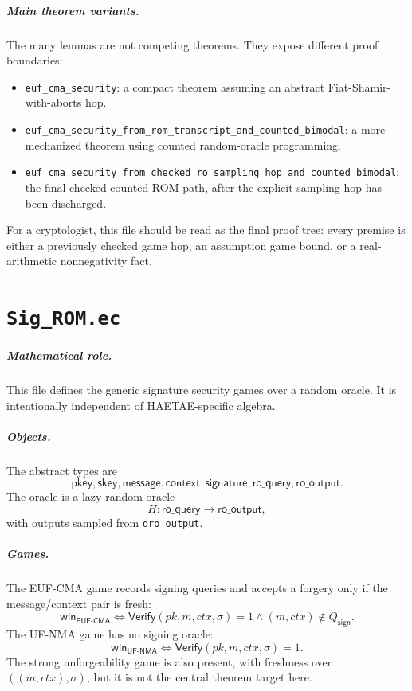 \documentclass[11pt]{report}
\newcommand{\ec}[1]{\nolinkurl{#1}}
\newcommand{\ecchapter}[2]{\chapter{\texorpdfstring{\texttt{#1}}{#2}}}
\newcommand{\EUFCMA}{\mathsf{EUF\mbox{-}CMA}}
\newcommand{\UFNMA}{\mathsf{UF\mbox{-}NMA}}
\theoremstyle{definition}
\theoremstyle{plain}
\theoremstyle{definition}
\begin{document}
\paragraph{Main theorem variants.}
The many lemmas are not competing theorems.  They expose different proof
boundaries:
\begin{itemize}[leftmargin=*]
  \item \ec{euf_cma_security}: a compact theorem assuming an abstract
  Fiat-Shamir-with-aborts hop.
  \item \ec{euf_cma_security_from_rom_transcript_and_counted_bimodal}: a more
  mechanized theorem using counted random-oracle programming.
  \item \ec{euf_cma_security_from_checked_ro_sampling_hop_and_counted_bimodal}:
  the final checked counted-ROM path, after the explicit sampling hop has been
  discharged.
\end{itemize}
For a cryptologist, this file should be read as the final proof tree: every
premise is either a previously checked game hop, an assumption game bound, or a
real-arithmetic nonnegativity fact.



\ecchapter{Sig\_ROM.ec}{Sig ROM.ec}

\paragraph{Mathematical role.}
This file defines the generic signature security games over a random oracle. It
is intentionally independent of HAETAE-specific algebra.

\paragraph{Objects.}
The abstract types are
\[
  \mathsf{pkey}, \mathsf{skey}, \mathsf{message}, \mathsf{context},
  \mathsf{signature}, \mathsf{ro\_query}, \mathsf{ro\_output}.
\]
The oracle is a lazy random oracle
\[
  H : \mathsf{ro\_query}\to\mathsf{ro\_output},
\]
with outputs sampled from \ec{dro_output}.

\paragraph{Games.}
The EUF-CMA game records signing queries and accepts a forgery only if the
message/context pair is fresh:
\[
  \mathsf{win}_{\EUFCMA}
  \Longleftrightarrow
  \mathsf{Verify}(pk,m,ctx,\sigma)=1
  \land (m,ctx)\notin Q_{\mathsf{sign}}.
\]
The UF-NMA game has no signing oracle:
\[
  \mathsf{win}_{\UFNMA}
  \Longleftrightarrow
  \mathsf{Verify}(pk,m,ctx,\sigma)=1.
\]
The strong unforgeability game is also present, with freshness over
\(((m,ctx),\sigma)\), but it is not the central theorem target here.
\end{document}
